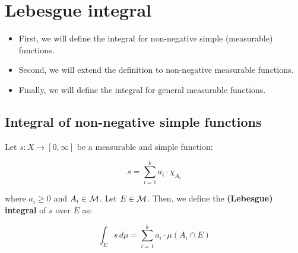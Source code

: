 \section{Lebesgue integral}

\begin{itemize}
    \item First, we will define the integral for non-negative simple (measurable)
    functions.

    \item Second, we will extend the definition to non-negative measurable functions.
    
    \item Finally, we will define the integral for general measurable functions.
\end{itemize}

\subsection{Integral of non-negative simple functions}

\begin{fdefinition}

    Let $s: X \to [0, \infty]$ be a measurable and simple function:

    $$s = \sum_{i = 1}^k a_i \cdot \chi_{A_i}$$

    where $a_i \geq 0$ and $A_i \in \mathcal{M}$. Let $E \in \mathcal{M}$. Then, we define the
    \textbf{(Lebesgue) integral} of $s$ over $E$ as:

    $$\int_{E} s \, d\mu = \sum_{i = 1}^k a_i \cdot \mu(A_i \cap E)$$
    
\end{fdefinition}

